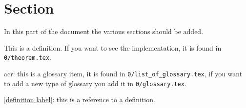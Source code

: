\documentclass{article}
\begin{document}
    \makeCustomTitle
    
    
    \tableofcontents
    
    
    \section{Section}
        In this part of the document the various sections should be added.

        \begin{definition}[Definition] \label{definition label}

            This is a definition. If you want to see the implementation, it is found in \texttt{0/theorem.tex}.
        \end{definition}

        \gls{acr}: this is a glossary item, it is found in \texttt{0/list\_of\_glossary.tex}, if you want to add a new type of glossary you add it in \texttt{0/glossary.tex}.

        \cref{definition label}: this is a reference to a definition.


    
    
    
    
\end{document}
